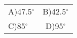 \setlength{\tabcolsep}{80pt}
 \renewcommand{\arraystretch}{2}
 
  \begin{tabular}{l c}
       A)47.5$^{\circ}$ & B)42.5$^{\circ}$ \\
       C)85$^{\circ}$& D)95$^{\circ}$
  \end{tabular}

